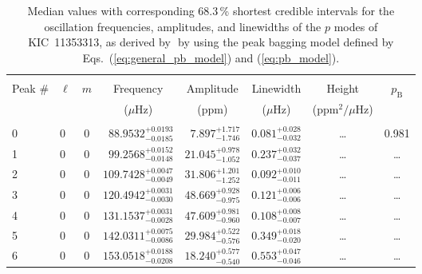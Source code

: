 \begin{table*}[!]
\caption{Median values with corresponding 68.3\,\% shortest credible intervals for the oscillation frequencies, amplitudes, and linewidths of the $p$ modes of KIC~11353313, as derived by \diamonds\,\,by using the peak bagging model defined by Eqs.~(\ref{eq:general_pb_model}) and (\ref{eq:pb_model}).}
\label{tab:11353313p}
\centering
\begin{tabular}{llcrrlrc}
\hline\hline
\\[-8pt]
Peak \# & $\ell$ & $m$ & \multicolumn{1}{c}{Frequency} & \multicolumn{1}{c}{Amplitude} & \multicolumn{1}{c}{Linewidth} & \multicolumn{1}{c}{Height}& $p_\mathrm{B}$\\
 & & & \multicolumn{1}{c}{($\mu$Hz)} & \multicolumn{1}{c}{(ppm)} & \multicolumn{1}{c}{($\mu$Hz)} & \multicolumn{1}{c}{(ppm$^2/\mu$Hz)}\\
\hline \\[-8pt]
0 & 0 & 0 & $     88.9532_{-      0.0185}^{+      0.0193}$ & $       7.897_{-       1.746}^{+       1.717}$ & $       0.081_{-       0.032}^{+       0.028}$ & \multicolumn{1}{c}{\dots} & 0.981 \\[1pt]
1 & 0 & 0 & $     99.2568_{-      0.0148}^{+      0.0152}$ & $      21.045_{-       1.052}^{+       0.978}$ & $       0.237_{-       0.037}^{+       0.032}$ & \multicolumn{1}{c}{\dots} & \dots \\[1pt]
2 & 0 & 0 & $    109.7428_{-      0.0049}^{+      0.0047}$ & $      31.806_{-       1.252}^{+       1.201}$ & $       0.092_{-       0.011}^{+       0.010}$ & \multicolumn{1}{c}{\dots} & \dots \\[1pt]
3 & 0 & 0 & $    120.4942_{-      0.0030}^{+      0.0031}$ & $      48.669_{-       0.975}^{+       0.928}$ & $       0.121_{-       0.006}^{+       0.006}$ & \multicolumn{1}{c}{\dots} & \dots \\[1pt]
4 & 0 & 0 & $    131.1537_{-      0.0028}^{+      0.0031}$ & $      47.609_{-       0.960}^{+       0.981}$ & $       0.108_{-       0.007}^{+       0.008}$ & \multicolumn{1}{c}{\dots} & \dots \\[1pt]
5 & 0 & 0 & $    142.0311_{-      0.0086}^{+      0.0075}$ & $      29.984_{-       0.576}^{+       0.522}$ & $       0.349_{-       0.020}^{+       0.018}$ & \multicolumn{1}{c}{\dots} & \dots \\[1pt]
6 & 0 & 0 & $    153.0518_{-      0.0208}^{+      0.0188}$ & $      18.240_{-       0.540}^{+       0.577}$ & $       0.553_{-       0.046}^{+       0.047}$ & \multicolumn{1}{c}{\dots} & \dots \\[1pt]

\end{tabular}
\end{table*}
